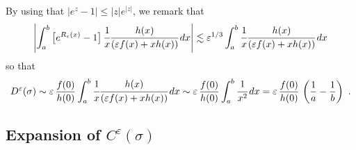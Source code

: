 \documentclass[reqno, 12pt, a4paper]{amsart}
\theoremstyle{plain}
\theoremstyle{definition}
\begin{document}
By using that $|e^z-1| \le |z| e^{|z|}$, we remark that
\begin{equation}
\begin{split}
\left\vert \int_a^b \big[e^{R_{\varepsilon} (x)} -1 \big] \,  \cfrac{1}{x} \cfrac{h(x)}{(\varepsilon f(x) +x h(x))} \, dx \right\vert \lesssim \varepsilon^{1/3}  \int_a^b \cfrac{1}{x} \cfrac{h(x)}{(\varepsilon f(x) +x h(x))} \, dx
\end{split}
\end{equation}
so that  
\begin{equation}
\label{eq:D_varepsilon (sigma)}
\begin{split}
D^\varepsilon (\sigma) \sim  \varepsilon \, \frac{f(0)}{h(0)} \int_a^b \cfrac{1}{x} \cfrac{h(x)}{(\varepsilon f(x) +x h(x))} \, dx \sim \varepsilon \, \frac{f(0)}{h(0)} \int_a^b \cfrac{1}{x^2} \, dx = \varepsilon \, \frac{f(0)}{h(0)}\,  \left( \frac{1}{a} -\frac{1}{b} \right) \ .
\end{split}
\end{equation}




\subsection{Expansion of $C^\varepsilon (\sigma)$}
\end{document}
